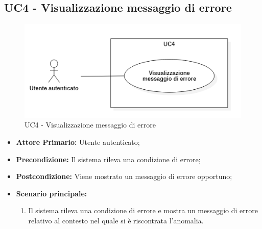 \subsection{UC4 - Visualizzazione messaggio di errore}
\begin{figure}[H]
    \centering
    \includegraphics[scale = 0.9]{components/img/UC4.png}
    \caption{UC4 - Visualizzazione messaggio di errore}
\end{figure}
\begin{itemize}
\item \textbf{Attore Primario:} Utente autenticato;
\item \textbf{Precondizione:} Il sistema rileva una condizione di errore;
\item \textbf{Postcondizione:} Viene mostrato un messaggio di errore opportuno;
\item \textbf{Scenario principale:}
    \begin{enumerate}
    \item Il sistema rileva una condizione di errore e mostra un messaggio di errore relativo al contesto nel quale si è riscontrata l'anomalia.
    \end{enumerate}
\end{itemize}